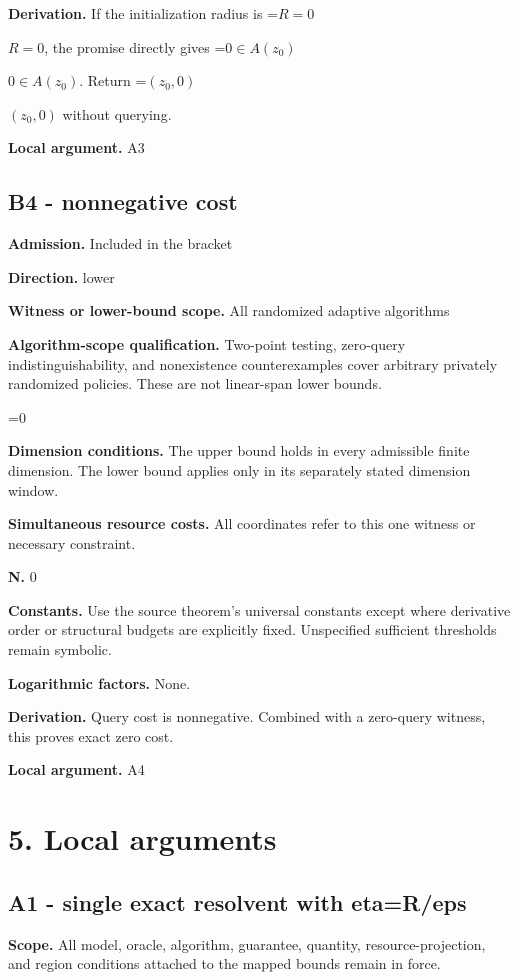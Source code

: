 \documentclass[10pt,a4paper]{article}
\newcommand{\AtlasMath}[1]{\par\begingroup\centering\setbox0=\hbox{$\displaystyle #1$}\ifdim\wd0>1.4\linewidth\typeout{ATLAS WIDE FORMULA: \the\wd0}\fi\ifdim\wd0>\linewidth\resizebox{\linewidth}{!}{\box0}\else\box0\fi\par\endgroup}
\newcommand{\AtlasInlineMath}[1]{\begingroup\setbox0=\hbox{$#1$}\ifdim\wd0>.4\linewidth\endgroup\AtlasMath{#1}\else\endgroup$#1$\fi}
\begin{document}
\textbf{Derivation.} If the initialization radius is \AtlasInlineMath{R=0}, the promise directly gives \AtlasInlineMath{0\in A(z_0)}. Return \AtlasInlineMath{(z_0,0)} without querying.

\textbf{Local argument.} A3

\subsection{B4 - nonnegative cost}
\textbf{Admission.} Included in the bracket

\textbf{Direction.} lower

\textbf{Witness or lower-bound scope.} All randomized adaptive algorithms

\textbf{Algorithm-scope qualification.} Two-point testing, zero-query indistinguishability, and nonexistence counterexamples cover arbitrary privately randomized policies. These are not linear-span lower bounds.

\AtlasMath{0}
\textbf{Dimension conditions.} The upper bound holds in every admissible finite dimension. The lower bound applies only in its separately stated dimension window.

\textbf{Simultaneous resource costs.} All coordinates refer to this one witness or necessary constraint.

\textbf{N.} 0

\textbf{Constants.} Use the source theorem’s universal constants except where derivative order or structural budgets are explicitly fixed. Unspecified sufficient thresholds remain symbolic.

\textbf{Logarithmic factors.} None.

\textbf{Derivation.} Query cost is nonnegative. Combined with a zero-query witness, this proves exact zero cost.

\textbf{Local argument.} A4

\section{5. Local arguments}
\subsection{A1 - single exact resolvent with eta=R/eps}
\textbf{Scope.} All model, oracle, algorithm, guarantee, quantity, resource-projection, and region conditions attached to the mapped bounds remain in force.
\end{document}
